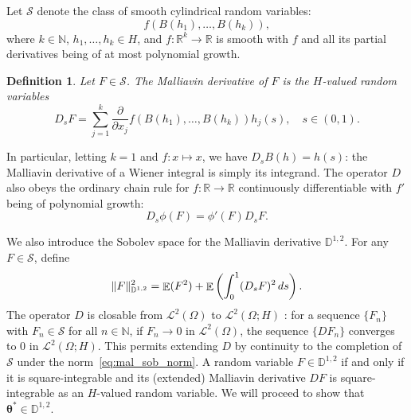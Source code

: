\documentclass[11pt, a4paper]{article}
\theoremstyle{theoremstyle}
\theoremstyle{definitionstyle}
\newtheorem{definition}[theorem]{Definition}
\newcommand{\dd}{\mathop{}\!d}
\DeclareMathOperator{\EE}{\mathbb E}
\newcommand{\pdv}[1]{\frac{\partial}{\partial#1}}
\DeclarePairedDelimiter{\norm}{\lVert}{\rVert}
\begin{document}
Let $\mathcal S$ denote the class of smooth cylindrical random variables:
\begin{equation}
    f\left (B(h_1),\dots,B(h_k) \right ),
\end{equation}
where $k \in \mathbb N$, $h_1, \dots, h_k \in H$, and $f: \mathbb R^k \to \mathbb R$ is smooth with $f$ and all its partial derivatives being of at most polynomial growth.

\begin{definition}
    Let $F \in \mathcal S$. The \emph{Malliavin derivative} of $F$ is the $H$-valued random variables
    \begin{equation}\label{eq:malliavin_derivative_def}
        D_s F = \sum_{j=1}^k \pdv{x_j} f(B(h_1), \dots, B(h_k))h_j(s), \quad s \in (0, 1).
    \end{equation}
\end{definition}

In particular, letting $k = 1$ and $f : x \mapsto x$, we have $D_sB(h) = h(s)$: the Malliavin derivative of a Wiener integral is simply its integrand. The operator $D$ also obeys the ordinary chain rule for $f : \mathbb R \to \mathbb R$ continuously differentiable with $f'$ being of polynomial growth:
\begin{equation}\label{eq:malliavin_chain_rule}
    D_s \phi(F) = \phi'(F)D_s F.
\end{equation}

We also introduce the Sobolev space for the Malliavin derivative $\mathbb D^{1, 2}$. For any $F \in \mathcal S$, define
\begin{equation}\label{eq:mal_sob_norm}
    \norm{F}^2_{\mathbb D^{1,2}} = \EE (F^2) + \EE \left ( \int_0^1 (D_sF)^2\dd{s} \right ).
\end{equation}
The operator $D$ is closable from $\mathcal L^2(\Omega)$ to $\mathcal L^2(\Omega; H)$ \cite{nualart2006malliavin,nualartnualart2018}: for a sequence $\{F_n\}$ with $F_n \in \mathcal S$ for all $n \in \mathbb N$, if $F_n \to 0$ in $\mathcal L^2(\Omega)$, the sequence $\{DF_n\}$ converges to $0$ in $\mathcal L^2(\Omega; H)$. This permits extending $D$ by continuity to the completion of $\mathcal S$ under the norm~\eqref{eq:mal_sob_norm}. A random variable $F\in\mathbb D^{1,2}$ if and only if it is square-integrable and its (extended) Malliavin derivative $DF$ is square-integrable as an $H$-valued random variable. We will proceed to show that $\boldsymbol \theta^* \in \mathbb D^{1, 2}$.
\end{document}
